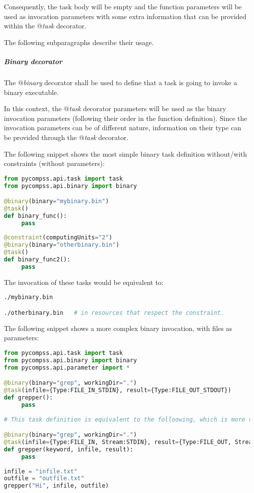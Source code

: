 Consequently, the task body will be empty and the function parameters will be used as invocation parameters
with some extra information that can be provided within the {\it $@$task} decorator.

The following subparagraphs describe their usage.

\subparagraph{Binary decorator}
\label{subpar:binary_decorator}

The {\it $@$binary} decorator shall be used to define that a task is going to invoke a binary executable.

In this context, the {\it $@$task} decorator parameters will be used as the binary invocation parameters
(following their order in the function definition). Since the invocation parameters can be of different nature, 
information on their type can be provided through the {\it $@$task} decorator.

The following snippet shows the most simple binary task definition without/with constraints (without parameters):

\begin{lstlisting}[language=python]
from pycompss.api.task import task
from pycompss.api.binary import binary

@binary(binary="mybinary.bin")
@task()
def binary_func():
     pass
     
@constraint(computingUnits="2")
@binary(binary="otherbinary.bin")
@task()
def binary_func2():
     pass
\end{lstlisting}

The invocation of these tasks would be equivalent to:

\begin{lstlisting}[language=bash]
./mybinary.bin 

./otherbinary.bin   # in resources that respect the constraint.
\end{lstlisting}

The following snippet shows a more complex binary invocation, with files as parameters:

\begin{lstlisting}[language=python]
from pycompss.api.task import task
from pycompss.api.binary import binary
from pycompss.api.parameter import *

@binary(binary="grep", workingDir=".")
@task(infile={Type:FILE_IN_STDIN}, result={Type:FILE_OUT_STDOUT})
def grepper():
     pass
     
# This task definition is equivalent to the folloowing, which is more verbose:

@binary(binary="grep", workingDir=".")
@task(infile={Type:FILE_IN, Stream:STDIN}, result={Type:FILE_OUT, Stream:STDOUT})
def grepper(keyword, infile, result):
     pass
     
infile = "infile.txt"
outfile = "outfile.txt"
grepper("Hi", infile, outfile)
\end{lstlisting}

